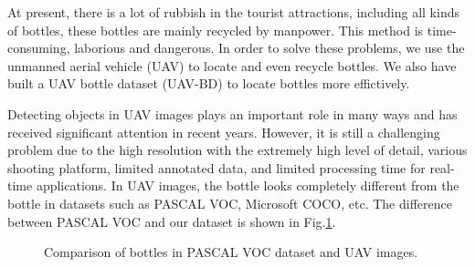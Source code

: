 \label{sec:intro}


At present, there is a lot of rubbish in the tourist attractions, including all kinds of bottles, these bottles are mainly recycled by manpower. This method is time-consuming, laborious and dangerous. In order to solve these problems, we use the unmanned aerial vehicle (UAV) to locate and even recycle bottles. We also have built a UAV bottle dataset (UAV-BD) to locate bottles more effictively.



Detecting objects in UAV images plays an important role in many ways and has received significant attention in recent years\cite{UAV2}. However, it is still a challenging problem due to the high resolution with the extremely high level of detail, various shooting platform, limited annotated data, and limited processing time for real-time applications\cite{car_detection}. In UAV images, the bottle looks completely different from the bottle in datasets such as PASCAL VOC\cite{PASCALVOC}, Microsoft COCO\cite{COCO}, etc. The difference between PASCAL VOC and our dataset is shown in Fig.\ref{bottle_VOC_UAV}.

\begin{figure}
	\centering
	
	\caption{Comparison of bottles in PASCAL VOC dataset and UAV images.}
	\label{bottle_VOC_UAV}
\end{figure}

